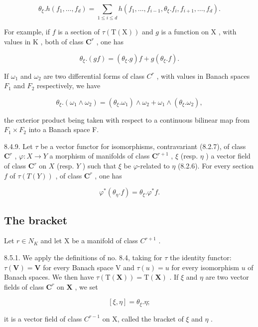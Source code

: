 \[
\theta_ {\xi}. h (f _ {1}, \dots , f _ {d}) = \sum_ {1 \leqslant i \leqslant d} h (f _ {1}, \dots , f _ {i - 1}, \theta_ {\xi}. f _ {i}, f _ {i + 1}, \dots , f _ {d}).\tag{6}
\]

For example, if \(f\) is a section of \(\tau(\mathrm{T}(\mathrm{X}))\) and \(g\) is a function on \(\mathrm{X}\) , with values in \(\mathrm{K}\) , both of class \(\mathbf{C}^r\) , one has

\[
\theta_ {\xi}. (g f) = (\theta_ {\xi}. g) f + g (\theta_ {\xi}. f).\tag{7}
\]

If \(\omega_{1}\) and \(\omega_{2}\) are two differential forms of class \(C^{r}\) , with values in Banach spaces \(F_{1}\) and \(F_{2}\) respectively, we have

\[
\theta_ {\xi}. (\omega_ {1} \wedge \omega_ {2}) = (\theta_ {\xi}. \omega_ {1}) \wedge \omega_ {2} + \omega_ {1} \wedge (\theta_ {\xi}. \omega_ {2}),\tag{8}
\]

the exterior product being taken with respect to a continuous bilinear map from \(F_{1} \times F_{2}\) into a Banach space F.

8.4.9. Let \(\tau\) be a vector functor for isomorphisms, contravariant (8.2.7), of class \(\mathbf{C}^r\) , \(\varphi: X \to Y\) a morphism of manifolds of class \(\mathbf{C}^{r+1}\) , \(\xi\) (resp. \(\eta\) ) a vector field of class \(\mathbf{C}^r\) on \(X\) (resp. \(Y\) ) such that \(\xi\) be \(\varphi\)-related to \(\eta\) (8.2.6). For every section \(f\) of \(\tau(T(Y))\) , of class \(\mathbf{C}^r\) , one has

\[
\varphi^ {*} (\theta_ {\eta}. f) = \theta_ {\xi}. \varphi^ {*} f.
\]

\subsection{The bracket}

Let \(r \in N_{K}\) and let X be a manifold of class \(C^{r+1}\) .

8.5.1. We apply the definitions of no. 8.4, taking for \(\tau\) the identity functor: \(\tau(\mathbf{V}) = \mathbf{V}\) for every Banach space V and \(\tau(u) = u\) for every isomorphism \(u\) of Banach spaces. We then have \(\tau(\mathrm{T}(\mathbf{X})) = \mathrm{T}(\mathbf{X})\) . If \(\xi\) and \(\eta\) are two vector fields of class \(\mathbf{C}^r\) on \(\mathbf{X}\) , we set

\[
[ \xi , \eta ] = \theta_ {\xi}. \eta ;\tag{1}
\]

it is a vector field of class \(C^{r-1}\) on X, called the bracket of \(\xi\) and \(\eta\) .

